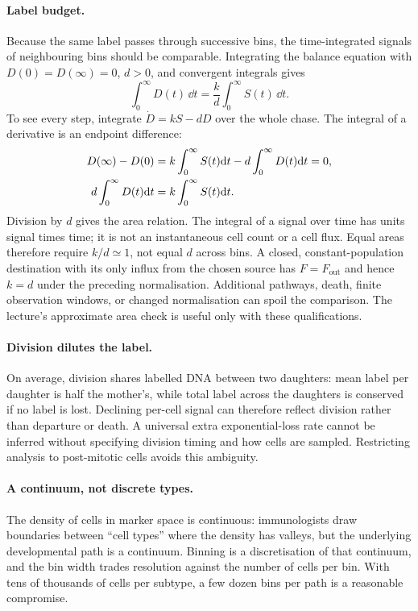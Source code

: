 \paragraph{Label budget.} Because the same label passes through successive bins, the time-integrated signals of neighbouring bins should be comparable. Integrating the balance equation with $D(0)=D(\infty)=0$, $d>0$, and convergent integrals gives
\begin{equation}\label{eq:lec02:area}
\int_0^\infty D(t)\,\dd t=\frac{k}{d}\int_0^\infty S(t)\,\dd t.
\end{equation}
To see every step, integrate $\dot D=kS-dD$ over the whole chase. The integral of a derivative is an endpoint difference:
\begin{align}
D(\infty)-D(0)&=k\int_0^\infty S(t)\mathrm{d} t-d\int_0^\infty D(t)\mathrm{d} t=0,\notag\\
d\int_0^\infty D(t)\mathrm{d} t&=k\int_0^\infty S(t)\mathrm{d} t.\label{eq:lec02:area-balance-steps}
\end{align}
Division by $d$ gives the area relation. The integral of a signal over time has units signal times time; it is not an instantaneous cell count or a cell flux.
Equal areas therefore require $k/d\simeq1$, not equal $d$ across bins. A closed, constant-population destination with its only influx from the chosen source has $F=F_{\mathrm{out}}$ and hence $k=d$ under the preceding normalisation. Additional pathways, death, finite observation windows, or changed normalisation can spoil the comparison. The lecture's approximate area check is useful only with these qualifications.

\paragraph{Division dilutes the label.} On average, division shares labelled DNA between two daughters: mean label per daughter is half the mother's, while total label across the daughters is conserved if no label is lost. Declining per-cell signal can therefore reflect division rather than departure or death. A universal extra exponential-loss rate cannot be inferred without specifying division timing and how cells are sampled. Restricting analysis to post-mitotic cells avoids this ambiguity.

\paragraph{A continuum, not discrete types.} The density of cells in marker space is continuous: immunologists draw boundaries between ``cell types'' where the density has valleys, but the underlying developmental path is a continuum. Binning is a discretisation of that continuum, and the bin width trades resolution against the number of cells per bin. With tens of thousands of cells per subtype, a few dozen bins per path is a reasonable compromise.


